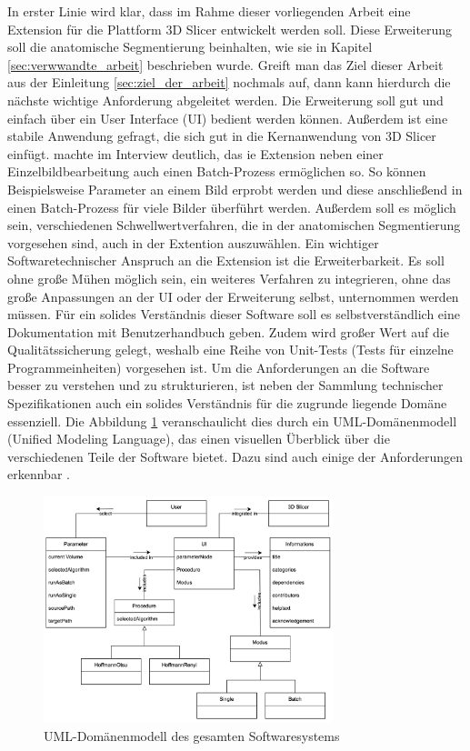 In erster Linie wird klar, dass im Rahme dieser vorliegenden Arbeit eine
Extension für die Plattform 3D Slicer entwickelt werden soll. Diese Erweiterung soll
die anatomische Segmentierung beinhalten, wie sie in Kapitel
\ref{sec:verwwandte_arbeit} beschrieben wurde. Greift man das Ziel dieser Arbeit
aus der Einleitung \ref{sec:ziel_der_arbeit} nochmals auf, dann kann hierdurch
die nächste wichtige Anforderung abgeleitet werden. Die Erweiterung soll gut und
einfach über ein User Interface (UI) bedient werden können. Außerdem ist eine
stabile Anwendung gefragt, die sich gut in die Kernanwendung von 3D Slicer einfügt.
\citet[]{walter2025} machte im Interview deutlich, das ie Extension neben einer
Einzelbildbearbeitung auch einen Batch-Prozess ermöglichen so. So können Beispielsweise
Parameter an einem Bild erprobt werden und diese anschließend in einen Batch-Prozess
für viele Bilder überführt werden. Außerdem soll es möglich sein, verschiedenen Schwellwertverfahren,
die in der anatomischen Segmentierung vorgesehen sind, auch in der Extention auszuwählen.
Ein wichtiger Softwaretechnischer Anspruch an die Extension ist die
Erweiterbarkeit. Es soll ohne große Mühen möglich sein, ein weiteres Verfahren
zu integrieren, ohne das große Anpassungen an der UI oder der Erweiterung selbst,
unternommen werden müssen. Für ein solides Verständnis dieser Software soll es selbstverständlich
eine Dokumentation mit Benutzerhandbuch geben. Zudem wird großer Wert auf die
Qualitätssicherung gelegt, weshalb eine Reihe von Unit-Tests (Tests für einzelne
Programmeinheiten) vorgesehen ist. Um die Anforderungen an die Software besser
zu verstehen und zu strukturieren, ist neben der Sammlung technischer Spezifikationen
auch ein solides Verständnis für die zugrunde liegende Domäne essenziell. Die
Abbildung \ref{fig:3d_slicer_domäne} veranschaulicht dies durch ein UML-Domänenmodell
(Unified Modeling Language), das einen visuellen Überblick über die verschiedenen
Teile der Software bietet. Dazu sind auch einige der Anforderungen erkennbar
\citep[vgl.][]{walter2025}.

\begin{figure}[h]
	\centering
	\includegraphics[width=0.75\textwidth]{img/domaenenmodell.jpg}
	\caption{UML-Domänenmodell des gesamten Softwaresystems}
	\label{fig:3d_slicer_domäne}
\end{figure}

